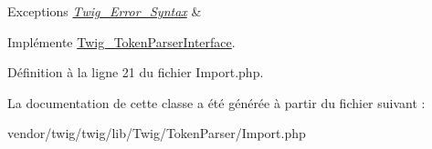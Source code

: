 \begin{DoxyExceptions}{Exceptions}
{\em \hyperlink{class_twig___error___syntax}{Twig\+\_\+\+Error\+\_\+\+Syntax}} & \\
\hline
\end{DoxyExceptions}


Implémente \hyperlink{interface_twig___token_parser_interface_a5dfa2e269321584fb74e8b43dabe0efd}{Twig\+\_\+\+Token\+Parser\+Interface}.



Définition à la ligne 21 du fichier Import.\+php.



La documentation de cette classe a été générée à partir du fichier suivant \+:\begin{DoxyCompactItemize}
\item 
vendor/twig/twig/lib/\+Twig/\+Token\+Parser/Import.\+php\end{DoxyCompactItemize}
